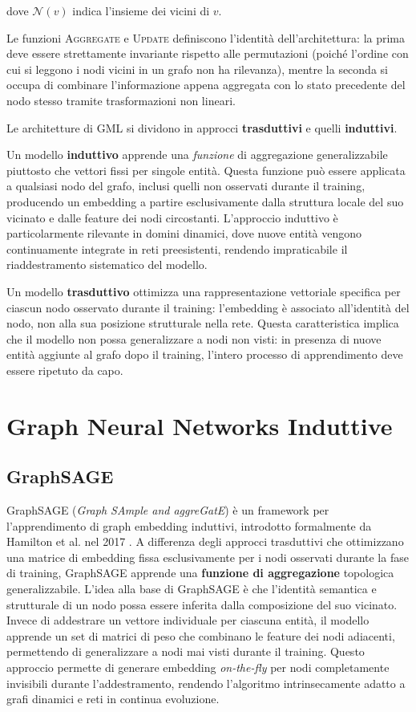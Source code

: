 dove $\mathcal{N}(v)$ indica l'insieme dei vicini di $v$. 

Le funzioni \textsc{Aggregate} e \textsc{Update} definiscono l'identità dell'architettura: la prima deve essere strettamente invariante rispetto alle permutazioni (poiché l'ordine con cui si leggono i nodi vicini in un grafo non ha rilevanza), mentre la seconda si occupa di combinare l'informazione appena aggregata con lo stato precedente del nodo stesso tramite trasformazioni non lineari.

Le architetture di GML si dividono in approcci \textbf{trasduttivi} e quelli \textbf{induttivi}.

Un modello \textbf{induttivo} apprende una \textit{funzione} di aggregazione generalizzabile piuttosto che vettori fissi per singole entità. Questa funzione può essere applicata a qualsiasi nodo del grafo,  inclusi quelli non osservati durante il training,  producendo un embedding a partire esclusivamente dalla struttura locale del suo vicinato e dalle feature dei nodi circostanti.  L'approccio induttivo è particolarmente rilevante in domini dinamici, dove nuove entità vengono continuamente 
integrate in reti preesistenti, rendendo impraticabile il riaddestramento sistematico del modello.

Un modello \textbf{trasduttivo} ottimizza una rappresentazione vettoriale specifica per ciascun nodo osservato durante il training: l'embedding è associato all'identità del nodo, non alla sua posizione strutturale nella rete. Questa caratteristica implica che il modello non possa generalizzare a nodi non visti: in presenza di nuove entità aggiunte al grafo dopo il training, l'intero processo di apprendimento deve essere ripetuto da capo. 



\section{Graph Neural Networks Induttive}

\subsection{GraphSAGE}

GraphSAGE (\textit{Graph SAmple and aggreGatE}) è un framework per l'apprendimento di graph embedding induttivi, introdotto formalmente da Hamilton et al. nel 2017 \cite{hamilton2017inductive}. A differenza degli approcci trasduttivi che ottimizzano una matrice di embedding fissa esclusivamente per i nodi osservati durante la fase di training, GraphSAGE apprende una \textbf{funzione di aggregazione} topologica generalizzabile. 
L'idea alla base di GraphSAGE è che l'identità semantica e strutturale di un nodo possa essere inferita dalla composizione del suo vicinato. Invece di addestrare un vettore individuale per ciascuna entità, il modello apprende un set di matrici di peso che combinano le feature dei nodi adiacenti, permettendo di generalizzare a nodi mai visti durante il training.
Questo approccio permette di generare embedding \textit{on-the-fly} per nodi completamente invisibili durante l'addestramento, rendendo l'algoritmo intrinsecamente adatto a grafi dinamici e reti in continua evoluzione.

